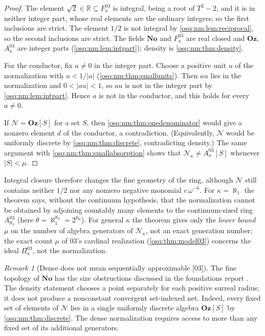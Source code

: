 \documentclass[11pt,letterpaper]{article}
\numberwithin{equation}{section}
\theoremstyle{definition}
\theoremstyle{remark}
\newtheorem{remark}[remark]{Remark}
\theoremstyle{plain}
\newcommand{\No}{\mathbf{No}}
\newcommand{\Oz}{\mathbf{Oz}}
\newcommand{\R}{\mathbb R}
\newcommand{\NN}{\mathcal N}         %
\newcommand{\src}[1]{\textup{\textsf{[#1]}}}
\begin{document}
\begin{proof}
The element $\sqrt2\in\R\subseteq F^{03}_\kappa$ is integral, being a root of $T^2-2$,
and it is in neither integer part, whose real elements are the ordinary integers; so the
first inclusions are strict. The element $1/2$ is not integral by
\cref{osq:nm:lem:reciprocal}, so the second inclusions are strict. The fields $\No$ and
$F^{03}_\kappa$ are real closed and $\Oz$, $A^{03}_\kappa$ are integer parts
(\cref{osq:nm:lem:intpart}); density is \cref{osq:nm:thm:density}.

For the conductor, fix $a\ne0$ in the integer part. Choose a positive unit $u$ of the
normalization with $u<1/|a|$ (\cref{osq:nm:thm:smallunits}). Then $au$ lies in the
normalization and $0<|au|<1$, so $au$ is not in the integer part by
\cref{osq:nm:lem:intpart}. Hence $a$ is not in the conductor, and this holds for every
$a\ne0$.

If $\NN=\Oz[S]$ for a set $S$, then \cref{osq:nm:thm:onedenominator} would give a nonzero
element $d$ of the conductor, a contradiction. (Equivalently, $\NN$ would be uniformly
discrete by \cref{osq:nm:thm:discrete}, contradicting density.) The same argument with
\cref{osq:nm:thm:smallabsorption} shows that $\NN_\kappa\ne A^{03}_\kappa[S]$ whenever
$|S|<\mu$.
\end{proof}

Integral closure therefore changes the fine geometry of the ring, although $\NN$ still
contains neither $1/2$ nor any nonzero negative monomial $c\,\omega^{-h}$. For
$\kappa=\aleph_1$ the theorem says, without the continuum hypothesis, that the
normalization cannot be obtained by adjoining countably many elements to the
continuum-sized ring $A^{03}_{\aleph_1}$ (here $\theta=\aleph_1^{\aleph_0}=2^{\aleph_0}$).
For general $\kappa$ the theorem gives only the \emph{lower bound} $\mu$ on the number of
algebra generators of $\NN_\kappa$, not an exact generation number; the exact count $\mu$
of 03's cardinal realization (\cref{osq:thm:model03}) concerns the ideal
$\Pi^{03}_\kappa$, not the normalization.

\begin{remark}[Dense does not mean sequentially approximable \src{03}]\label{osq:nm:rem:dense}
The fine topology of $\No$ has the size obstructions discussed in the foundations report
\cite{RepoFound}. The density statement chooses a point separately for each positive
surreal radius; it does not produce a nonconstant convergent set-indexed net. Indeed, every
fixed set of elements of $\NN$ lies in a single uniformly discrete algebra $\Oz[S]$ by
\cref{osq:nm:thm:discrete}. The dense normalization requires access to more than any
fixed set of its additional generators.
\end{remark}
\end{document}
